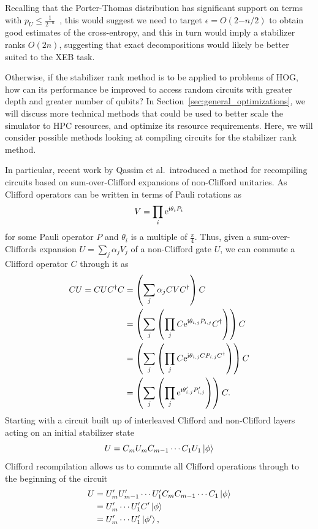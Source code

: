 Recalling that the Porter-Thomas distribution has significant support on terms with $p_{U}\leq \frac{1}{2^{-n}}$~\cite{Boixo2016}, this would suggest we need to target $\epsilon = O\left(2{-n/2}\right)$ to obtain good estimates of the cross-entropy, and this in turn would imply a stabilizer ranks $O(2{n})$,  suggesting that exact decompositions would likely be better suited to the XEB task.\par
Otherwise, if the stabilizer rank method is to be applied to problems of HOG, how can its performance be improved to access random circuits with greater depth and greater number of qubits? In Section~\ref{sec:general_optimizations}, we will discuss more technical methods that could be used to better scale the simulator to HPC resources, and optimize its resource requirements. Here, we will consider possible methods looking at compiling circuits for the stabilizer rank method.\par
In particular, recent work by Qassim et al.\ introduced a method for recompiling circuits based on sum-over-Clifford expansions of non-Clifford unitaries. As Clifford operators can be written in terms of Pauli rotations as
\[V=\prod_{i} \mathrm{e}^{\mathrm{i} \theta_{i} P_{i}}\]
for some Pauli operator $P$ and $\theta_{i}$ is a multiple of $\frac{\pi}{4}$. Thus, given a sum-over-Cliffords expansion $U=\sum_{j}\alpha_{j}V_{j}$ of a non-Clifford gate $U$, we can commute a Clifford operator $C$ through it as~\cite{Qassim2019}
\begin{align}
C U = CUC^{\dagger} C &= \left(\sum_{j}\alpha_{j}CVC^{\dagger}\right)C \nonumber \\
&= \left(\sum_{j}\left(\prod_{j} C\mathrm{e}^{\mathrm{i}\theta_{i,j}P_{i,j}}C^{\dagger} \right)\right)C\nonumber\\
&= \left(\sum_{j}\left(\prod_{j} C\mathrm{e}^{\mathrm{i}\theta_{i,j}CP_{i,j}C^{\dagger}} \right)\right)C \nonumber \\
&= \left(\sum_{j}\left(\prod_{j} \mathrm{e}^{\mathrm{i}\theta'_{i,j}P'_{i,j}} \right)\right)C.
\end{align}
Starting with a circuit built up of interleaved Clifford and non-Clifford layers acting on an initial stabilizer state
\[U = C_{m}U_{m}C_{m-1}\cdots C_{1}U_{1}\ket{\phi}\]
Clifford recompilation allows us to commute all Clifford operations through to the beginning of the circuit
\begin{align*}
U &= U_{m}'U_{m-1}'\cdots U_{1}' C_{m}C_{m-1}\cdots C_{1}\ket{\phi} \\
  &= U_{m}'\cdots U_{1}' C'\ket{\phi}\\
  &= U_{m}'\cdots U_{1}'\ket{\phi'},
\end{align*}
